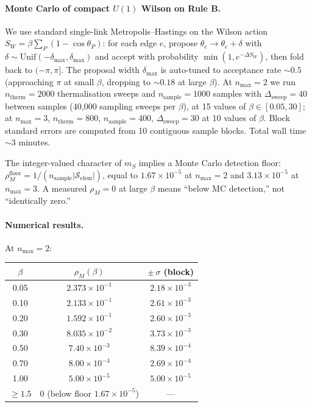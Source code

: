 \documentclass[11pt]{article}
\begin{document}
\paragraph{Monte Carlo of compact $U(1)$ Wilson on Rule B.} We use standard
single-link Metropolis--Hastings on the Wilson action $S_W=\beta\sum_P(1-\cos\theta_P)$:
for each edge $e$, propose $\theta_e\to\theta_e+\delta$ with
$\delta\sim\text{Unif}(-\delta_\text{max},\delta_\text{max})$ and accept with
probability $\min(1,e^{-\Delta S_W})$, then fold back to $(-\pi,\pi]$. The
proposal width $\delta_\text{max}$ is auto-tuned to acceptance rate $\sim 0.5$
(approaching $\pi$ at small $\beta$, dropping to $\sim 0.18$ at large $\beta$).
At $n_\text{max}=2$ we run $n_\text{therm}=2000$ thermalisation sweeps and
$n_\text{sample}=1000$ samples with $\Delta_\text{sweep}=40$ between samples
(40{,}000 sampling sweeps per $\beta$), at 15 values of $\beta\in[0.05,30]$;
at $n_\text{max}=3$, $n_\text{therm}=800$, $n_\text{sample}=400$,
$\Delta_\text{sweep}=30$ at 10 values of $\beta$. Block standard errors are
computed from 10 contiguous sample blocks. Total wall time $\sim 3$ minutes.

The integer-valued character of $m_S$ implies a Monte Carlo detection floor:
$\rho_M^\text{floor}=1/(n_\text{sample}|\mathcal{S}_\text{elem}|)$, equal to
$1.67\times 10^{-5}$ at $n_\text{max}=2$ and $3.13\times 10^{-5}$ at
$n_\text{max}=3$. A measured $\rho_M=0$ at large $\beta$ means ``below MC
detection,'' not ``identically zero.''

\paragraph{Numerical results.} At $n_\text{max}=2$:

\begin{center}
\begin{tabular}{ccc}
\toprule
$\beta$ & $\rho_M(\beta)$ & $\pm\,\sigma$ (block) \\
\midrule
0.05 & $2.373\times 10^{-1}$ & $2.18\times 10^{-3}$ \\
0.10 & $2.133\times 10^{-1}$ & $2.61\times 10^{-3}$ \\
0.20 & $1.592\times 10^{-1}$ & $2.60\times 10^{-3}$ \\
0.30 & $8.035\times 10^{-2}$ & $3.73\times 10^{-3}$ \\
0.50 & $7.40\times 10^{-3}$  & $8.39\times 10^{-4}$ \\
0.70 & $8.00\times 10^{-4}$  & $2.69\times 10^{-4}$ \\
1.00 & $5.00\times 10^{-5}$  & $5.00\times 10^{-5}$ \\
$\ge 1.5$ & $0$ (below floor $1.67\times 10^{-5}$) & --- \\
\bottomrule
\end{tabular}
\end{center}
\end{document}
